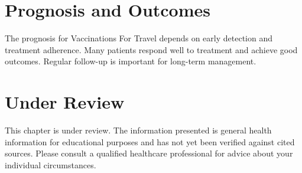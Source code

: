 \section*{Prognosis and Outcomes}
The prognosis for Vaccinations For Travel depends on early detection and treatment adherence. Many patients respond well to treatment and achieve good outcomes. Regular follow-up is important for long-term management.
\section*{Under Review}
This chapter is under review. The information presented is general health information for educational purposes and has not yet been verified against cited sources. Please consult a qualified healthcare professional for advice about your individual circumstances.


\clearpage
